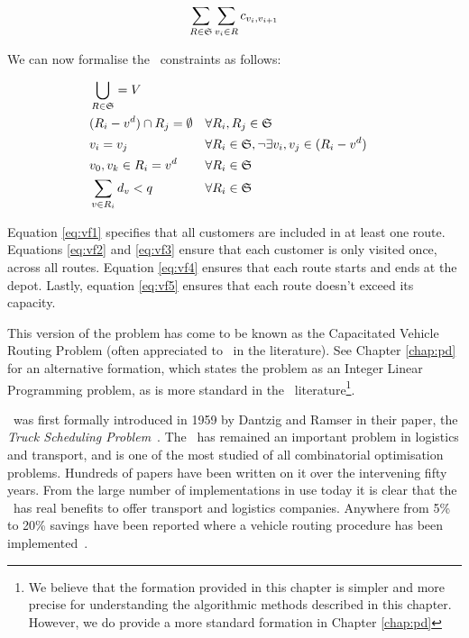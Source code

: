 \[
   \sum_{R \in \mathfrak{S}} \sum_{v_i \in R} c_{v_i, v_{i+1}}
\]

We can now formalise the \VRP\ constraints as follows:

\begin{align}
   & \bigcup_{R \in \mathfrak{S}} = V \label{eq:vf1}\\
   & (R_i - v^d) \cap R_j = \emptyset  && \forall R_i, R_j \in \mathfrak{S} \label{eq:vf2}\\
   & v_i = v_j                               && \forall R_i \in \mathfrak{S}, \lnot \exists v_i, v_j \in (R_i - v^d) \label{eq:vf3}\\
   & v_0, v_k \in R_i = v^d                  && \forall R_i \in \mathfrak{S} \label{eq:vf4}\\
   & \sum_{v \in R_i} d_v < q                && \forall R_i \in \mathfrak{S} \label{eq:vf5}
\end{align}

Equation \eqref{eq:vf1} specifies that all customers are included in at least one route. Equations \eqref{eq:vf2} and \eqref{eq:vf3} ensure that each customer is only visited once, across all routes. Equation \eqref{eq:vf4} ensures that each route starts and ends at the depot. Lastly, equation \eqref{eq:vf5} ensures that each route doesn't exceed its capacity. 

This version of the problem has come to be known as the Capacitated Vehicle Routing Problem (often appreciated to \CVRP\ in the literature). See Chapter \ref{chap:pd} for an alternative formation, which states the problem as an Integer Linear Programming problem, as is more standard in the \VRP\ literature\footnote{We believe that the formation provided in this chapter is simpler and more precise for understanding the algorithmic methods described in this chapter. However, we do provide a more standard formation in Chapter \ref{chap:pd}}.

\VRP\ was first formally introduced in 1959 by Dantzig and Ramser in their paper, the \emph{Truck Scheduling Problem}~\cite{Dantzig:1959}. The \VRP\ has remained an important problem in logistics and transport, and is one of the most studied of all combinatorial optimisation problems. Hundreds of papers have been written on it over the intervening fifty years. From the large number of implementations in use today it is clear that the \VRP\ has real benefits to offer transport and logistics companies. Anywhere from 5\% to 20\% savings have been reported where a vehicle routing procedure has been implemented~\cite{TV2001}.

